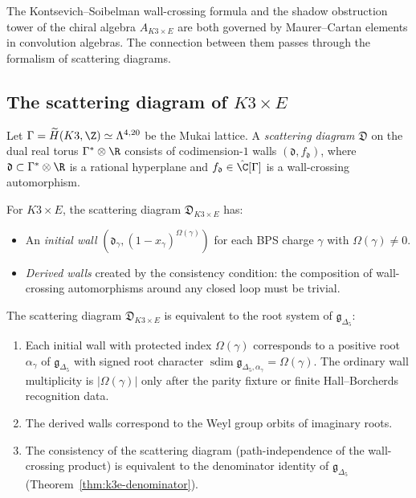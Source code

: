 The Kontsevich--Soibelman wall-crossing formula and the shadow obstruction tower of the chiral algebra $A_{K3 \times E}$ are both governed by Maurer--Cartan elements in convolution algebras. The connection between them passes through the formalism of scattering diagrams.

\subsection{The scattering diagram of \texorpdfstring{$K3 \times E$}{K3 x E}}
\label{subsec:k3e-scattering-diagram}

\begin{definition}
\label{def:k3e-scattering}
Let $\Gamma = \widetilde{H}(K3, \Z) \simeq \Lambda^{4,20}$ be the Mukai lattice. A \emph{scattering diagram} $\mathfrak{D}$ on the dual real torus $\Gamma^* \otimes \R$ consists of codimension-$1$ walls $(\mathfrak{d}, f_{\mathfrak{d}})$, where $\mathfrak{d} \subset \Gamma^* \otimes \R$ is a rational hyperplane and $f_{\mathfrak{d}} \in \hat{\C}[\Gamma]$ is a wall-crossing automorphism.

For $K3 \times E$, the scattering diagram $\mathfrak{D}_{K3 \times E}$ has:
\begin{itemize}
 \item An \emph{initial wall} $(\mathfrak{d}_\gamma, (1 - x_\gamma)^{\Omega(\gamma)})$ for each BPS charge $\gamma$ with $\Omega(\gamma) \neq 0$.
 \item \emph{Derived walls} created by the consistency condition: the composition of wall-crossing automorphisms around any closed loop must be trivial.
\end{itemize}
\end{definition}

\begin{theorem}[KS scattering = BKM root system]
\label{thm:k3e-scattering-bkm}
The scattering diagram $\mathfrak{D}_{K3 \times E}$ is equivalent to the root system of $\mathfrak{g}_{\Delta_5}$:
\begin{enumerate}[label=(\roman*)]
 \item Each initial wall with protected index $\Omega(\gamma)$ corresponds to a positive root $\alpha_\gamma$ of $\mathfrak{g}_{\Delta_5}$ with signed root character $\operatorname{sdim}\mathfrak g_{\Delta_5,\alpha_\gamma}=\Omega(\gamma)$. The ordinary wall multiplicity is $|\Omega(\gamma)|$ only after the parity fixture or finite Hall--Borcherds recognition data.
 \item The derived walls correspond to the Weyl group orbits of imaginary roots.
 \item The consistency of the scattering diagram (path-independence of the wall-crossing product) is equivalent to the denominator identity of $\mathfrak{g}_{\Delta_5}$ (Theorem~\ref{thm:k3e-denominator}).
\end{enumerate}
\end{theorem}

